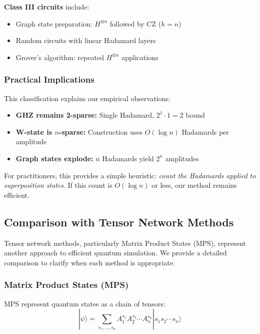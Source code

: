 \documentclass[11pt,twocolumn]{article}
\begin{document}
\textbf{Class III circuits} include:
\begin{itemize}
    \item Graph state preparation: $H^{\otimes n}$ followed by CZ ($h = n$)
    \item Random circuits with linear Hadamard layers
    \item Grover's algorithm: repeated $H^{\otimes n}$ applications
\end{itemize}

\subsubsection{Practical Implications}

This classification explains our empirical observations:
\begin{itemize}
    \item \textbf{GHZ remains 2-sparse:} Single Hadamard, $2^1 \cdot 1 = 2$ bound
    \item \textbf{W-state is $n$-sparse:} Construction uses $O(\log n)$ Hadamards per amplitude
    \item \textbf{Graph states explode:} $n$ Hadamards yield $2^n$ amplitudes
\end{itemize}

For practitioners, this provides a simple heuristic: \emph{count the Hadamards applied to superposition states}. If this count is $O(\log n)$ or less, our method remains efficient.

\subsection{Comparison with Tensor Network Methods}

Tensor network methods, particularly Matrix Product States (MPS), represent another approach to efficient quantum simulation. We provide a detailed comparison to clarify when each method is appropriate.

\subsubsection{Matrix Product States (MPS)}

MPS represent quantum states as a chain of tensors:
\begin{equation}
    |\psi\rangle = \sum_{s_1,\ldots,s_n} A^{s_1}_1 A^{s_2}_2 \cdots A^{s_n}_n |s_1 s_2 \cdots s_n\rangle
\end{equation}
\end{document}
